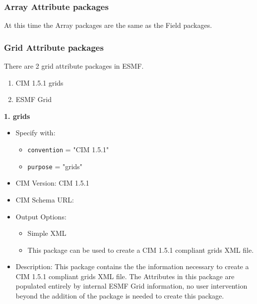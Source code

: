 \vspace{.20in}

\subsubsection{Array Attribute packages}
\label{ArrayAttributePackages}

At this time the Array packages are the same as the Field packages.

\vspace{.20in}

\subsubsection{Grid Attribute packages}
\label{GridAttributePackages}

There are 2 grid attribute packages in ESMF.

\begin{enumerate}
    \item CIM 1.5.1 grids
    \item ESMF Grid
\end{enumerate}

\vspace{.20in}

{\bf 1. grids}

\label{CIMGridAttributePackage}

\begin{itemize}
    \item Specify with:
    \begin{itemize}
        \item {\tt convention} = "CIM 1.5.1"
        \item {\tt purpose} = "grids"
    \end{itemize}
    \item CIM Version: CIM 1.5.1
    \item CIM Schema URL: 
    \item Output Options:
    \begin{itemize}
        \item Simple XML
        \item This package can be used to create a CIM 1.5.1 compliant grids XML file.
    \end{itemize}
    \item Description: This package contains the the information necessary to create a CIM 1.5.1 compliant grids XML file.  The Attributes in this package are populated entirely by internal ESMF Grid information, no user intervention beyond the addition of the package is needed to create this package.
\end{itemize}

